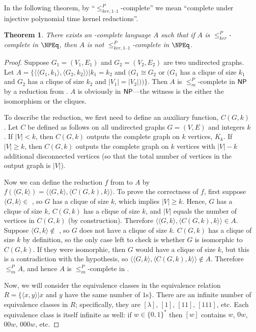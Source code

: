 \documentclass{article}
\newtheorem{theorem}{Theorem}[section]
\theoremstyle{definition} \newtheorem{definition}[definition]{Definition}
\newcommand{\sigmastar}{\{0, 1\}^{*}} %
\newcommand{\kr}{\leq^{P}_{ker}} %
\newcommand{\kri}{\leq^{P}_{ker,1\text{--}1}} %
\newcommand{\mor}{\leq^{P}_{m}} %
\newcommand{\pair}[2]{\langle#1,#2\rangle} %
\begin{document}
In the following theorem, by ``$\kri$-complete'' we mean ``complete under injective polynomial time kernel reductions''.

\begin{theorem}
  There exists an \NP-complete language $A$ such that if $A$ is $\kr$-complete
  in $\NPEq$, then $A$ is not $\kri$-complete in $\NPEq$.
\end{theorem}
\begin{proof}
  Suppose $G_1=(V_1, E_1)$ and $G_2=(V_2, E_2)$ are two undirected graphs.
  Let $A=\{\pair{\pair{G_1}{k_1}}{\pair{G_2}{k_2}}| k_1=k_2$ and $(G_1\cong G_2$ or $(G_1$ has a clique of size $k_1$ and $G_2$ has a clique of size $k_2$ and $|V_1|=|V_2|))\}$.
  Then $A$ is $\mor$-complete in ${\mathsf{NP}}$ by a reduction from .
  $A$ is obviously in ${\mathsf{NP}}$---the witness is the either the isomorphism or the cliques.
  
  To describe the reduction, we first need to define an auxiliary function, $C(G, k)$.
  Let $C$ be defined as follows on all undirected graphs $G=(V, E)$ and integers $k$.
  If $|V| < k$, then $C(G, k)$ outputs the complete graph on $k$ vertices, $K_k$.
  If $|V|\geq k$, then $C(G, k)$ outputs the complete graph on $k$ vertices with $|V|-k$ additional disconnected vertices (so that the total number of vertices in the output graph is $|V|$).

  Now we can define the reduction $f$ from  to $A$ by $f(\pair{G}{k})=\pair{\pair{G}{k}}{\pair{C(G, k)}{k}}$.
  To prove the correctness of $f$, first suppose $\pair{G}{k}\in$ , so $G$ has a clique of size $k$, which implies $|V|\geq k$.
  Hence, $G$ has a clique of size $k$, $C(G, k)$ has a clique of size $k$, and $|V|$ equals the number of vertices in $C(G, k)$ (by construction).
  Therefore $\pair{\pair{G}{k}}{\pair{C(G, k)}{k}}\in A$.
  Suppose $\pair{G}{k}\notin$ , so $G$ does not have a clique of size $k$.
  $C(G, k)$ has a clique of size $k$ by definition, so the only case left to check is whether $G$ is isomorphic to $C(G, k)$.
  If they were isomorphic, then $G$ would have a clique of size $k$, but this is a contradiction with the hypothesis, so $\pair{\pair{G}{k}}{\pair{C(G, k)}{k}}\notin A$.
  Therefore $\mor A$, and hence $A$ is $\mor$-complete in \NP.

  Now, we will consider the equivalence classes in the equivalence relation $R=\{\pair{x}{y}|x$ and $y$ have the same number of $1$s$\}$.
  There are an infinite number of equivalence classes in $R$; specifically, they are $[\lambda]$, $[1]$, $[11]$, $[111]$, etc.
  Each equivalence class is itself infinite as well: if $w\in\sigmastar$ then $[w]$ contains $w$, $0w$, $00w$, $000w$, etc.


\end{proof}
\end{document}
